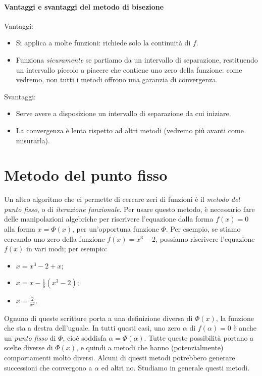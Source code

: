 \documentclass[a4paper]{report}
\theoremstyle{definiton}
\theoremstyle{remark}
\begin{document}
\paragraph{Vantaggi e svantaggi del metodo di bisezione}

Vantaggi:

\begin{itemize}
    \item Si applica a molte funzioni: richiede solo la continuità di $f$.
    \item Funziona \emph{sicuramente} se partiamo da un intervallo di separazione, restituendo un intervallo piccolo a piacere che contiene uno zero della funzione: come vedremo, non tutti i metodi offrono una garanzia di convergenza.
\end{itemize}

Svantaggi:

\begin{itemize}
    \item Serve avere a disposizione un intervallo di separazione da cui iniziare.
    \item La convergenza è lenta rispetto ad altri metodi (vedremo più avanti come misurarla).
\end{itemize}


\section{Metodo del punto fisso}

Un altro algoritmo che ci permette di cercare zeri di funzioni è il \emph{metodo del punto fisso}, o di \emph{iterazione funzionale}. Per usare questo metodo, è necessario fare delle manipolazioni algebriche per riscrivere l'equazione dalla forma $f(x) = 0$ alla forma $x = \Phi(x)$, per un'opportuna funzione $\Phi$. Per esempio, se stiamo cercando uno zero della funzione $f(x) = x^3 - 2$, possiamo riscrivere l'equazione $f(x)$ in vari modi; per esempio: 
\begin{itemize}
    \item $x = x^3 - 2 + x$;
    \item $x = x - \frac16 (x^3-2)$;
    \item $x = \frac{2}{x^2}$.
\end{itemize}
Ognuno di queste scritture porta a una definizione diversa di $\Phi(x)$, la funzione che sta a destra dell'uguale. In tutti questi casi, uno zero $\alpha$ di $f(\alpha)=0$ è anche un \emph{punto fisso} di $\Phi$, cioè soddisfa $\alpha = \Phi(\alpha)$. Tutte queste possibilità portano a scelte diverse di $\Phi(x)$, e quindi a metodi che hanno (potenzialmente) comportamenti molto diversi. Alcuni di questi metodi potrebbero generare successioni che convergono a $\alpha$ ed altri no. Studiamo in generale questi metodi.
\end{document}
